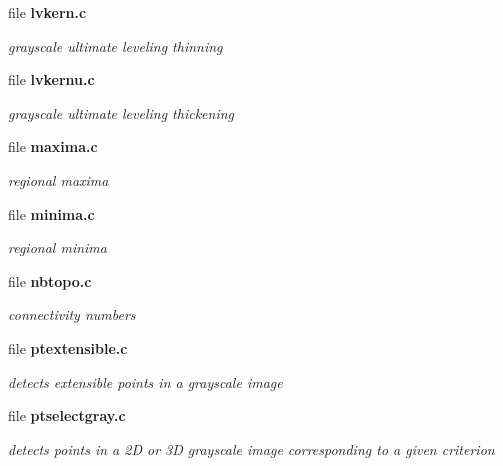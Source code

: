 \begin{DoxyCompactItemize}
\item 
file {\bf lvkern.c}


\begin{DoxyCompactList}\small\item\em grayscale ultimate leveling thinning \item\end{DoxyCompactList}

\item 
file {\bf lvkernu.c}


\begin{DoxyCompactList}\small\item\em grayscale ultimate leveling thickening \item\end{DoxyCompactList}

\item 
file {\bf maxima.c}


\begin{DoxyCompactList}\small\item\em regional maxima \item\end{DoxyCompactList}

\item 
file {\bf minima.c}


\begin{DoxyCompactList}\small\item\em regional minima \item\end{DoxyCompactList}

\item 
file {\bf nbtopo.c}


\begin{DoxyCompactList}\small\item\em connectivity numbers \item\end{DoxyCompactList}

\item 
file {\bf ptextensible.c}


\begin{DoxyCompactList}\small\item\em detects extensible points in a grayscale image \item\end{DoxyCompactList}

\item 
file {\bf ptselectgray.c}


\begin{DoxyCompactList}\small\item\em detects points in a 2D or 3D grayscale image corresponding to a given criterion \item\end{DoxyCompactList}


\end{DoxyCompactItemize}
